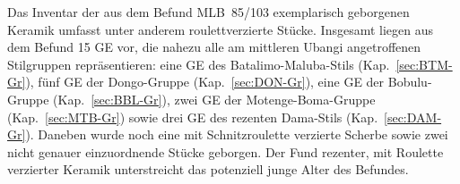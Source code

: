 \vspace{1em}
\noindent Das Inventar der aus dem Befund MLB~85/103 exemplarisch geborgenen Keramik umfasst unter anderem roulettverzierte Stücke. Insgesamt liegen aus dem Befund 15 GE vor, die nahezu alle am mittleren \mbox{Ubangi} angetroffenen Stilgruppen repräsentieren: eine GE des Batalimo-Maluba-Stils (Kap.~\ref{sec:BTM-Gr}), fünf GE der Dongo-Gruppe (Kap.~\ref{sec:DON-Gr}), eine GE der Bobulu-Gruppe (Kap.~\ref{sec:BBL-Gr}), zwei GE der Motenge-Boma-Gruppe (Kap.~\ref{sec:MTB-Gr}) sowie drei GE des rezenten Dama-Stils (Kap.~\ref{sec:DAM-Gr}). Daneben wurde noch eine mit Schnitzroulette verzierte Scherbe sowie zwei nicht genauer einzuordnende Stücke geborgen. Der Fund rezenter, mit \mbox{Roulette} verzierter Keramik unterstreicht das potenziell junge Alter des Befundes.

